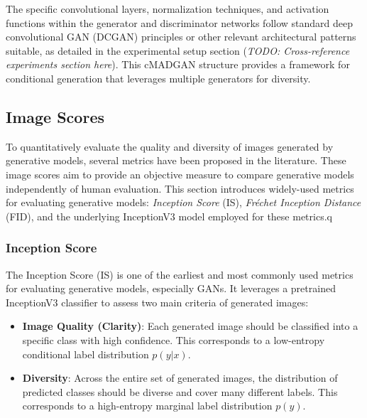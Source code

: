 The specific convolutional layers, normalization techniques, and activation functions within the generator and discriminator networks follow standard deep convolutional GAN (DCGAN) \cite{Radford2015DCGAN} principles or other relevant architectural patterns suitable, as detailed in the experimental setup section (\textit{TODO: Cross-reference experiments section here}). This cMADGAN structure provides a framework for conditional generation that leverages multiple generators for diversity.





\subsection{Image Scores}\label{theoretical_image_scores}

To quantitatively evaluate the quality and diversity of images generated by generative models, several metrics have been proposed in the literature. These image scores aim to provide an objective measure to compare generative models independently of human evaluation. This section introduces widely-used metrics for evaluating generative models: \textit{Inception Score} (IS), \textit{Fréchet Inception Distance} (FID), and the underlying InceptionV3 model employed for these metrics.q

\subsubsection[Inception Score - IS]{Inception Score}
The Inception Score (IS) \cite{salimans2016improvedtechniquestraininggans} is one of the earliest and most commonly used metrics for evaluating generative models, especially GANs. It leverages a pretrained InceptionV3 classifier to assess two main criteria of generated images:

\begin{itemize}
    \item \textbf{Image Quality (Clarity)}: Each generated image should be classified into a specific class with high confidence. This corresponds to a low-entropy conditional label distribution \( p(y|x) \).
    \item \textbf{Diversity}: Across the entire set of generated images, the distribution of predicted classes should be diverse and cover many different labels. This corresponds to a high-entropy marginal label distribution \( p(y) \).
\end{itemize}

